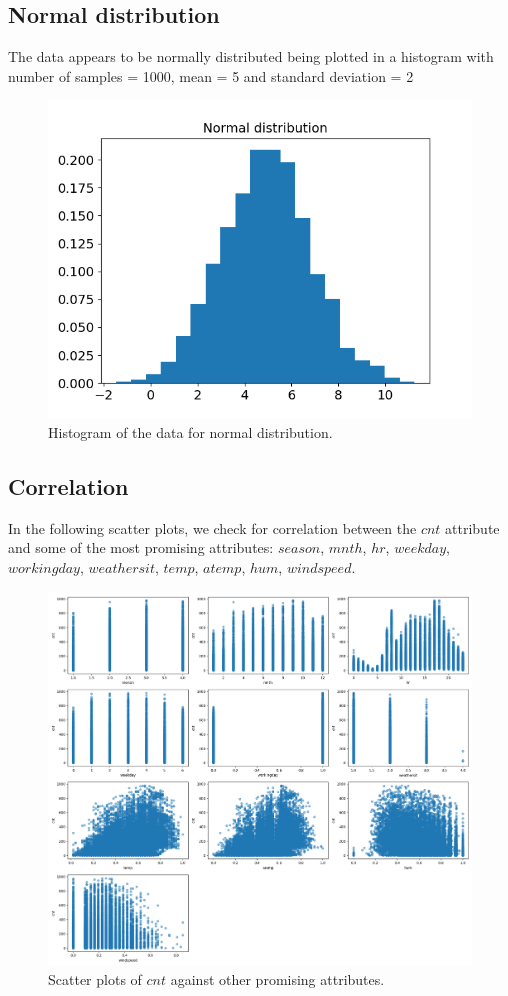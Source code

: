 \documentclass[11pt,a4paper]{article}
\begin{document}
\subsection{Normal distribution}
The data appears to be normally distributed being plotted in a histogram with number of samples = 1000, mean = 5 and standard deviation = 2

\begin{figure}[H]
    \centering
    \includegraphics[width=0.6\linewidth]{res/plots/normal_distribution.png}
    \caption{Histogram of the data for normal distribution.}
    \label{fig:normal}
\end{figure}

\subsection{Correlation}

In the following scatter plots, we check for correlation between the $cnt$ attribute and some of the most promising attributes: $season$, $mnth$, $hr$, $weekday$, $workingday$, $weathersit$, $temp$, $atemp$, $hum$, $windspeed$. 

\begin{figure}[H]
    \centering
    \includegraphics[width=\linewidth]{res/plots/correlation.png}
    \caption{Scatter plots of $cnt$ against other promising attributes.}
    \label{fig:correlation}
\end{figure}
\end{document}
